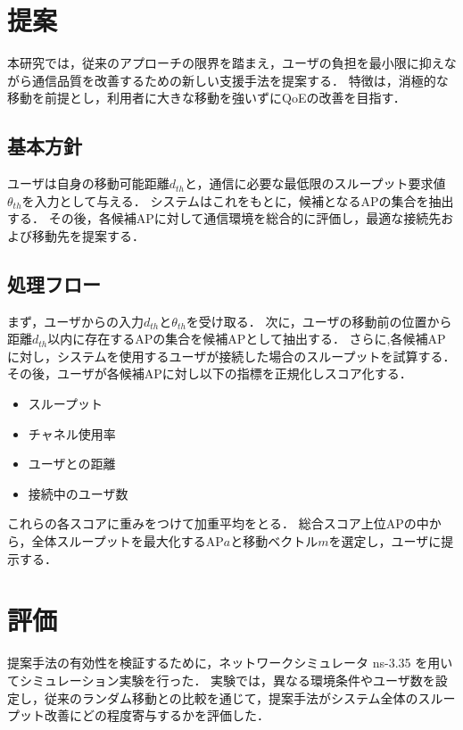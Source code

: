 \documentclass[dvipdfmx,twocolumn]{jsarticle}
\newcommand{\Note}[1]{\noindent \textbf{\textcolor{blue}{#1}}}
\begin{document}
\section{提案}
本研究では，従来のアプローチの限界を踏まえ，ユーザの負担を最小限に抑えながら通信品質を改善するための新しい支援手法を提案する．
特徴は，消極的な移動を前提とし，利用者に大きな移動を強いずにQoEの改善を目指す．
\subsection{基本方針}
ユーザは自身の移動可能距離$d_{th}$と，通信に必要な最低限のスループット要求値$\theta_{th}$を入力として与える．
システムはこれをもとに，候補となるAPの集合を抽出する．
その後，各候補APに対して通信環境を総合的に評価し，最適な接続先および移動先を提案する．
\subsection{処理フロー}
まず，ユーザからの入力$d_{th}$と$\theta_{th}$を受け取る．
次に，ユーザの移動前の位置から距離$d_{th}$以内に存在するAPの集合を候補APとして抽出する．
さらに,各候補APに対し，システムを使用するユーザが接続した場合のスループットを試算する．
その後，ユーザが各候補APに対し以下の指標を正規化しスコア化する．
\begin{itemize}
  \item スループット
  \item チャネル使用率
  \item ユーザとの距離
  \item 接続中のユーザ数
\end{itemize}
これらの各スコアに重みをつけて加重平均をとる．
総合スコア上位APの中から，全体スループットを最大化するAP$a$と移動ベクトル$m$を選定し，ユーザに提示する．


\section{評価}
提案手法の有効性を検証するために，ネットワークシミュレータ ns-3.35 を用いてシミュレーション実験を行った．
実験では，異なる環境条件やユーザ数を設定し，従来のランダム移動との比較を通じて，提案手法がシステム全体のスループット改善にどの程度寄与するかを評価した．
\end{document}
